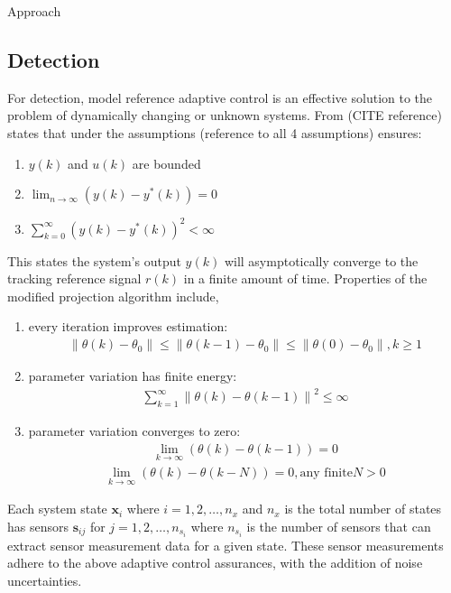 \begin{section}{Approach}
\subsection{Detection}
For detection, model reference adaptive control is an effective solution to the problem of dynamically changing or unknown systems. From (CITE reference) states that under the assumptions (reference to all 4 assumptions) ensures:
	\begin{enumerate}[label=(\roman*),leftmargin=4\parindent]
	\item $y(k)$ and $u(k)$ are bounded 
	\item $\lim_{n\to\infty}(y(k)-y^*(k))=0$
	\item $\sum_{k=0}^\infty(y(k)-y^*(k))^2<\infty$
	\end{enumerate}
This states the system's output $y(k)$ will asymptotically converge to the tracking reference signal $r(k)$ in a finite amount of time. Properties of the modified projection algorithm include,
    \begin{enumerate}[label=(\roman*),leftmargin=3\parindent]
	\item every iteration improves estimation:
	    \begin{align}
	        \|\theta(k)-\theta_0\|\leq\|\theta(k-1)-\theta_0\|\leq\|\theta(0)-\theta_0\|, k\geq1 \nonumber
	    \end{align}
	\item parameter variation has finite energy:
	    \begin{align}
	        \sum_{k=1}^\infty{\|\theta(k)-\theta(k-1)\|}^2\leq \infty \nonumber
	    \end{align}
	\item parameter variation converges to zero:
	    \begin{align}
	        \lim_{k\to\infty}(\theta(k)-\theta(k-1))=0 \nonumber
	    \end{align}
	    \begin{align}
	        \lim_{k\to\infty}(\theta(k)-\theta(k-N))=0, \text{any finite} N>0 \nonumber
	    \end{align}
	\end{enumerate}

Each system state $\bm{x}_i$ where $i=1,2,\dots,n_x$ and $n_x$ is the total number of states has sensors $\bm{s}_{ij}$ for $j=1,2,\dots,n_{s_i}$ where $n_{s_i}$ is the number of sensors that can extract sensor measurement data for a given state. These sensor measurements adhere to the above adaptive control assurances, with the addition of noise uncertainties.


\end{section}
